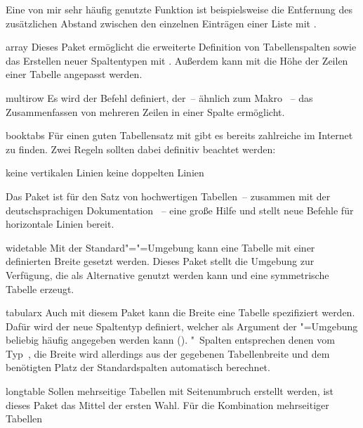 \begin{packages}
  Eine von mir sehr häufig genutzte Funktion ist beispielsweise die Entfernung 
  des zusätzlichen Abstand zwischen den einzelnen Einträgen einer Liste mit 
  .
\item[array]
  Dieses Paket ermöglicht die erweiterte Definition von Tabellenspalten sowie 
  das Erstellen neuer Spaltentypen mit . Außerdem kann 
  mit  die Höhe der Zeilen einer Tabelle angepasst 
  werden.
\item[multirow]
  Es wird der Befehl  definiert, der~-- ähnlich zum Makro 
  ~-- das Zusammenfassen von mehreren Zeilen in einer 
  Spalte ermöglicht.
\item[booktabs]
  Für einen guten Tabellensatz mit  gibt es bereits zahlreiche 
   im 
  Internet zu finden. Zwei Regeln sollten dabei definitiv beachtet werden:
  \begin{enumerate}[itemindent=0pt,labelwidth=*,labelsep=1em,label=\Roman*.]
  \itempackages keine vertikalen Linien
  \itempackages keine doppelten Linien
  \end{enumerate}
  Das Paket  ist für den Satz von hochwertigen Tabellen~-- 
  zusammen mit der deutschsprachigen Dokumentation ~-- 
  eine große Hilfe und stellt neue Befehle für horizontale Linien bereit.
\item[widetable]
  Mit der Standard"="=Umgebung  kann eine 
  Tabelle mit einer definierten Breite gesetzt werden. Dieses Paket stellt die 
  Umgebung  zur Verfügung, die als Alternative genutzt 
  werden kann und eine symmetrische Tabelle erzeugt.
\item[tabularx]
  Auch mit diesem Paket kann die Breite eine Tabelle spezifiziert werden. Dafür 
  wird der neue Spaltentyp  definiert, welcher als Argument der 
  "=Umgebung beliebig häufig angegeben werden kann
  (). 
  "~Spalten entsprechen denen vom Typ~, 
  die Breite wird allerdings aus der gegebenen Tabellenbreite und dem 
  benötigten Platz der Standardspalten automatisch berechnet.
\item[longtable]
  Sollen mehrseitige Tabellen mit Seitenumbruch erstellt werden, ist dieses 
  Paket das Mittel der ersten Wahl. Für die Kombination mehrseitiger Tabellen 

\end{packages}

